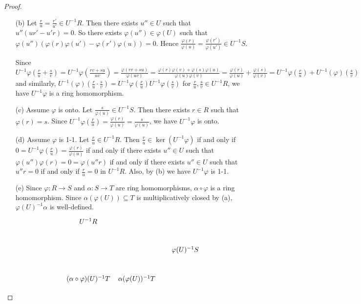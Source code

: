 \begin{proof}
    \begin{enumerate}
        \item [(b)] 
            Let $\frac{r}{u} = \frac{r'}{u'} \in U^{-1}R$. Then there exists $u'' \in U$ such that $u''(ur'-u'r) = 0$. So there exists $\varphi(u'') \in \varphi(U)$ such that $\varphi(u'')(\varphi(r)\varphi(u') - \varphi(r')\varphi(u)) = 0$. Hence $\frac{\varphi(r)}{\varphi(u)} = \frac{\varphi(r')}{\varphi(u')} \in U^{-1}S$. \par  
            Since $U^{-1}\varphi(\frac{r}{u} + \frac{s}{v}) = U^{-1}\varphi(\frac{rv+su}{uv}) = \frac{\varphi(rv+su)}{\varphi(uv)} = \frac{\varphi(r)\varphi(v)+\varphi(s)\varphi(u)}{\varphi(u)\varphi(v)} = \frac{\varphi(r)}{\varphi(u)}+\frac{\varphi(s)}{\varphi(v)} = U^{-1}\varphi(\frac{r}{u})+U^{-1}(\varphi)(\frac{s}{v})$ and similarly, $U^{-1}(\varphi)(\frac{r}{u} \cdot\frac{s}{v}) = U^{-1}\varphi(\frac{r}{u})U^{-1}\varphi(\frac{s}{v})$ for $\frac{r}{u},\frac{s}{v} \in U^{-1}R$, we have $U^{-1}\varphi$ is a ring homomorphism. 
        \item [(c)]
            Assume $\varphi$ is onto. Let $\frac{s}{\varphi(u)} \in U^{-1}S$. Then there exists $r \in R$ such that $\varphi(r) = s$. Since $U^{-1}\varphi(\frac{r}{u}) = \frac{\varphi(r)}{\varphi(u)} = \frac{s}{\varphi(u)}$, we have $U^{-1}\varphi$ is onto.
        \item[(d)] Assume $\varphi$ is 1-1. Let $\frac{r}{u} \in U^{-1}R$. Then $\frac{r}{u} \in \ker(U^{-1}\varphi)$ if and only if $0 = U^{-1}\varphi(\frac{r}{u}) = \frac{\varphi(r)}{\varphi(u)}$ if and only if there exists $u'' \in U$ such that $\varphi(u'')\varphi(r) = 0 = \varphi(u''r)$ if and only if there exists $u'' \in U$ such that $u''r = 0$ if and only if $\frac{r}{u} = 0$ in $U^{-1}R$. Also, by (b) we have $U^{-1}\varphi$ is 1-1.
        \item[(e)]
            Since $\varphi:R \to S$ and $\alpha: S \to T$ are ring homomorphisms, $\alpha \circ \varphi$ is a ring homomorphism. Since $\alpha(\varphi(U)) \subseteq T$ is multiplicatively closed by (a), $\varphi(U)^{-1}\alpha$ is well-defined. 
        \[
            \begin{tikzpicture}[auto]
                \node (UR) {$U^{-1}R$};
                \node (UT)[node distance=3cm, below of=UR] {$(\alpha \circ \varphi)(U)^{-1}T$};
                \node (XXX)[node distance=1.5cm, below of=UR] {};
                \node (US)[node distance=5cm, right of=XXX] {$\varphi(U)^{-1}S$};
                \node (UT2)[node distance=2.5cm, right of=UT] {$\alpha (\varphi(U))^{-1}T$};

\end{tikzpicture}\]
\end{enumerate}
\end{proof}
